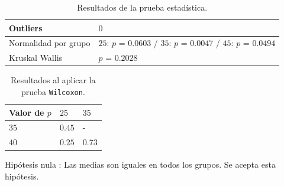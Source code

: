 \documentclass{article}
\begin{document}
\begin{table}[h!]
\centering
\caption{Resultados de la prueba estadística.}
\smallskip

\begin{tabular}{ |p{4cm}|p{8cm}|}
 \hline
 Outliers & $0$ \\
 \hline
 Normalidad por grupo & $25$: $p$ = $0.0603$ / $35$: $p$ = $0.0047$ / $45$: $p$ = $0.0494$ \\
 \hline
 Kruskal Wallis & $p$ = $0.2028$ \\
 \hline
\end{tabular}
\label{Cuadro5}
\end{table}

\begin{table}[h!]
\centering
\caption{Resultados al aplicar la prueba \texttt{Wilcoxon}.}
\smallskip

\begin{tabular}{|p{1.7cm}|p{1.7cm}|p{1.7cm}|}
 \hline
Valor de $p$ & $25$ & $35$ \\
 \hline
 $35$ & $0.45$ & -   \\
 \hline
 $40$ & $0.25$ & $0.73$  \\
 \hline
\end{tabular}
\label{Cuadro6}
\end{table}

Hipótesis nula : Las medias son iguales en todos los grupos. Se acepta esta hipótesis.
\end{document}
